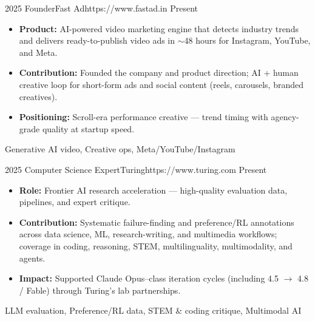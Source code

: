 \begin{experiences}

\experience
    {2025}   {Founder}{Fast Ad}{https://www.fastad.in}
    {Present} {
                      \begin{itemize}
                       \item \textbf{Product:} AI-powered video marketing engine that detects industry trends and delivers ready-to-publish video ads in $\sim$48 hours for Instagram, YouTube, and Meta.
                       \item \textbf{Contribution:} Founded the company and product direction; AI + human creative loop for short-form ads and social content (reels, carousels, branded creatives).
                       \item \textbf{Positioning:} Scroll-era performance creative --- trend timing with agency-grade quality at startup speed.
                      \end{itemize}
                    }
                    {Generative AI video, Creative ops, Meta/YouTube/Instagram}

\emptySeparator

\experience
    {2025}   {Computer Science Expert}{Turing}{https://www.turing.com}
    {Present} {
                      \begin{itemize}
                       \item \textbf{Role:} Frontier AI research acceleration --- high-quality evaluation data, pipelines, and expert critique.
                       \item \textbf{Contribution:} Systematic failure-finding and preference/RL annotations across data science, ML, research-writing, and multimedia workflows; coverage in coding, reasoning, STEM, multilinguality, multimodality, and agents.
                       \item \textbf{Impact:} Supported Claude Opus--class iteration cycles (including 4.5 $\rightarrow$ 4.8 / Fable) through Turing's lab partnerships.
                      \end{itemize}
                    }
                    {LLM evaluation, Preference/RL data, STEM \& coding critique, Multimodal AI}

\emptySeparator


\end{experiences}
